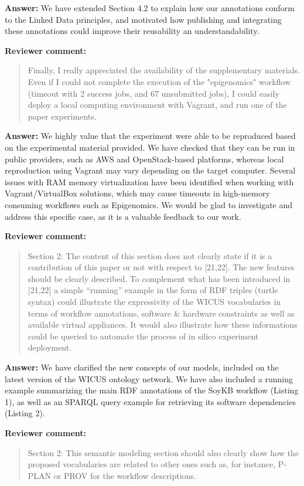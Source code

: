 \documentclass{letter}
\newenvironment{review}%
{\textbf{Reviewer comment:}\begin{quote}}%
{\end{quote}}%
\newcommand{\answer}[1]{%
      \textbf{Answer:} #1}
\begin{document}
\begin{letter}{}
\answer{We have extended Section 4.2 to explain how our annotations conform to the Linked Data principles, and motivated how publishing and integrating these annotations could improve their reusability an understandability.}


\begin{review}
Finally, I really appreciated the availability of the supplementary materials. Even if I could not complete the execution of the "epigenomics" workflow (timeout with 2 success jobs, and 67 unsubmitted jobs), I could easily deploy a local computing environment with Vagrant, and run one of the paper experiments.
\end{review}

\answer{We highly value that the experiment were able to be reproduced based on the experimental material provided. We have checked that they can be run in public providers, such as AWS and OpenStack-based platforms, whereas local reproduction using Vagrant may vary depending on the target computer. Several issues with RAM memory virtualization have been identified when working with Vagrant/VirtualBox solutions, which may cause timeouts in high-memory consuming workflows such as Epigenomics. We would be glad to investigate and address this specific case, as it is a valuable feedback to our work.}


\begin{review}
Section 2: The content of this section does not clearly state if it is a contribution of this paper or not with respect to [21,22]. The new features should be clearly described. To complement what has been introduced in [21,22] a simple ``running'' example in the form of RDF triples (turtle syntax) could illustrate the expressivity of the WICUS vocabularies in terms of workflow annotations, software \& hardware constraints as well as available virtual appliances. It would also illustrate how these informations could be queried to automate the process of in silico experiment deployment.
\end{review}

\answer{We have clarified the new concepts of our models, included on the latest version of the WICUS ontology network. We have also included a running example summarizing the main RDF annotations of the SoyKB workflow (Listing 1), as well as an SPARQL query example for retrieving its software dependencies (Listing 2).}


\begin{review}
Section 2: This semantic modeling section should also clearly show how the proposed vocabularies are related to other ones such as, for instance, P-PLAN or PROV for the workflow descriptions.
\end{review}


\end{letter}
\end{document}
